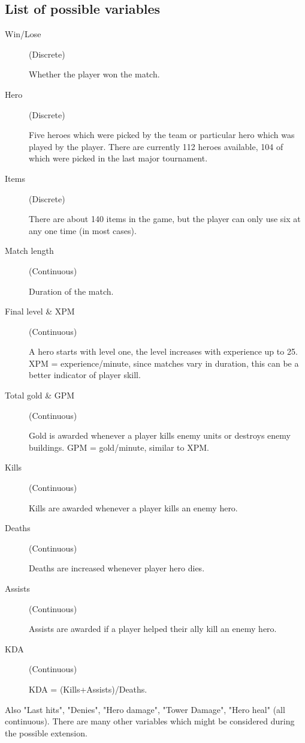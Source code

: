 \documentclass[12pt,a4paper]{article}
\begin{document}
\subsection{List of possible variables} \label{app:Variables} 
\begin{description}
\item
[Win/Lose] (Discrete)

Whether the player won the match.

\item
[Hero] (Discrete)

Five heroes which were picked by the team or particular hero which was played by the player. There are currently 112 heroes available, 104 of which were picked in the last major tournament.

\item
[Items] (Discrete) 

There are about 140 items in the game, but the player can only use six at any one time (in most cases). 

\item
[Match length] (Continuous) 

Duration of the match.

\item
[Final level \& XPM] (Continuous)

A hero starts with level one, the level increases with experience up to 25. XPM = experience/minute, since matches vary in duration, this can be a better indicator of player skill.

\item
[Total gold \& GPM] (Continuous) 

Gold is awarded whenever a player kills enemy units or destroys enemy buildings. GPM = gold/minute, similar to XPM.

\item
[Kills] (Continuous) 

Kills are awarded whenever a player kills an enemy hero.

\item
[Deaths] (Continuous)

Deaths are increased whenever player hero dies.
 
\item
[Assists] (Continuous)

Assists are awarded if a player helped their ally kill an enemy hero.

\item
[KDA] (Continuous) 

KDA = (Kills+Assists)/Deaths.



\end{description}

Also "Last hits", "Denies", "Hero damage", "Tower Damage", "Hero heal" (all continuous).
There are many other variables which might be considered during the possible extension.
\end{document}
